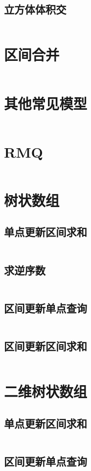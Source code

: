 \documentclass[a4paper,11pt]{article}
\begin{document}
\subsection*{立方体体积交}
\inputminted[]{c++}{Template/Segment/hdu3642.cpp}
\section*{区间合并}
\inputminted[]{c++}{Template/Segment/SegmentMerge.cpp}
\section*{其他常见模型}
\inputminted[]{c++}{Template/Segment/OtherModel.cpp}
\section*{RMQ}
\inputminted[]{c++}{Template/Segment/RMQ.cpp}
\section*{树状数组}
\subsection*{单点更新区间求和}
\inputminted[]{c++}{Template/Segment/TreeArrayI.cpp}
\subsection*{求逆序数}
\inputminted[]{c++}{Template/Segment/Reverse.cpp}
\subsection*{区间更新单点查询}
\inputminted[]{c++}{Template/Segment/TreeArrayII.cpp}
\subsection*{区间更新区间求和}
\inputminted[]{c++}{Template/Segment/TreeArrayIII.cpp}
\section*{二维树状数组}
\subsection*{单点更新区间求和}
\inputminted[]{c++}{Template/Segment/TwoDimTreeArrayI.cpp}
\subsection*{区间更新单点查询}
\inputminted[]{c++}{Template/Segment/TwoDimTreeArrayII.cpp}
\end{document}
